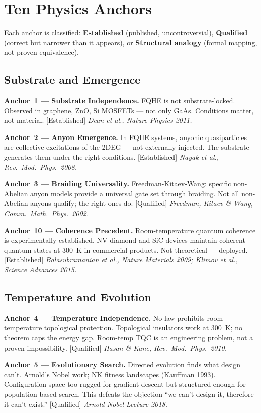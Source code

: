 \section*{Ten Physics Anchors}

Each anchor is classified: \textbf{Established} (published, uncontroversial), \textbf{Qualified} (correct but narrower than it appears), or \textbf{Structural analogy} (formal mapping, not proven equivalence).

\subsection*{Substrate and Emergence}

\textbf{Anchor~1 --- Substrate Independence.} FQHE is not substrate-locked. Observed in graphene, ZnO, Si MOSFETs --- not only GaAs. Conditions matter, not material. [Established]
\textit{Dean et al., Nature Physics 2011.}

\textbf{Anchor~2 --- Anyon Emergence.} In FQHE systems, anyonic quasiparticles are collective excitations of the 2DEG --- not externally injected. The substrate generates them under the right conditions. [Established]
\textit{Nayak et al., Rev.\ Mod.\ Phys.\ 2008.}

\textbf{Anchor~3 --- Braiding Universality.} Freedman-Kitaev-Wang: specific non-Abelian anyon models provide a universal gate set through braiding. Not all non-Abelian anyons qualify; the right ones do. [Qualified]
\textit{Freedman, Kitaev \& Wang, Comm.\ Math.\ Phys.\ 2002.}

\textbf{Anchor~10 --- Coherence Precedent.} Room-temperature quantum coherence is experimentally established. NV-diamond and SiC devices maintain coherent quantum states at 300~K in commercial products. Not theoretical --- deployed. [Established]
\textit{Balasubramanian et al., Nature Materials 2009; Klimov et al., Science Advances 2015.}

\subsection*{Temperature and Evolution}

\textbf{Anchor~4 --- Temperature Independence.} No law prohibits room-temperature topological protection. Topological insulators work at 300~K; no theorem caps the energy gap. Room-temp TQC is an engineering problem, not a proven impossibility. [Qualified]
\textit{Hasan \& Kane, Rev.\ Mod.\ Phys.\ 2010.}

\textbf{Anchor~5 --- Evolutionary Search.} Directed evolution finds what design can't. Arnold's Nobel work; NK fitness landscapes (Kauffman 1993). Configuration space too rugged for gradient descent but structured enough for population-based search. This defeats the objection ``we can't design it, therefore it can't exist.'' [Qualified]
\textit{Arnold Nobel Lecture 2018.}

